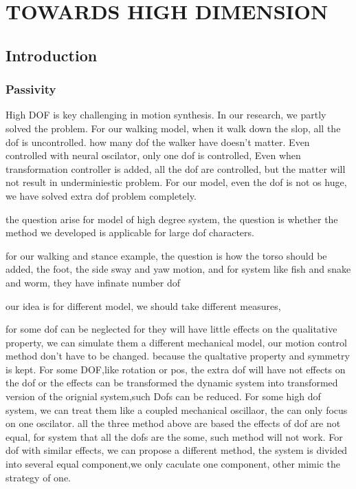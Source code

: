 \chapter{TOWARDS HIGH DIMENSION}
\label{chap:highdor}
\ifpdf
    \graphicspath{{BipedWalk/HiDofFigs/PNG/}{HiDof/HiDofFigs/PDF/}{HiDof/HiDofFigs/}}
\else
    \graphicspath{{HiDof/HiDofFigs/EPS/}{HiDof/HiDofFigs/}}
\fi
\section{Introduction}
\subsection*{Passivity}
High DOF is key challenging in motion synthesis.
In our research, we partly solved the problem.
For our walking model, when it walk down the slop, all the dof is uncontrolled.
how many dof the walker have doesn't matter.
Even controlled with neural oscilator, only one dof is controlled, 
Even when transformation controller is added, all the dof are controlled, but the matter will not result in underminiestic problem.
For our model, even the dof is not os huge, we have solved extra dof problem completely.

the question arise for model of high degree system, the question is whether the method we developed is applicable for large dof characters.


for our walking and stance example, the question is how the torso should be added, the foot, the side sway and yaw motion, and for system like fish and snake and worm,
they have infinate number dof 

our idea is for different model, 
we should take different measures, 
\begin{itemize}

for some dof can be neglected for they will have little effects on the qualitative property, 
we can simulate them a different mechanical model, our motion control method don't have to be changed.
because the qualtative property and symmetry is kept.
For some DOF,like rotation or pos, the extra dof will have not effects on the dof or the effects can be transformed the dynamic system into transformed version of the orignial system,such Dofs can be reduced.
For some high dof system, we can treat them like a coupled mechanical oscillaor, the can only focus on one oscilator.
all the three method above are based the effects of dof are not equal, for system that all the dofs are the some, such method will not work.
For dof with similar effects, we can propose a different method, the system is divided into several equal component,we only caculate one component, other mimic the strategy of one.
\end{itemize} 

